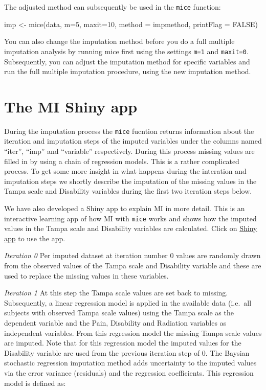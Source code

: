 \documentclass[
]{book}
\newenvironment{Shaded}{\begin{snugshade}}{\end{snugshade}}
\newcommand{\AttributeTok}[1]{\textcolor[rgb]{0.77,0.63,0.00}{#1}}
\newcommand{\ConstantTok}[1]{\textcolor[rgb]{0.00,0.00,0.00}{#1}}
\newcommand{\DecValTok}[1]{\textcolor[rgb]{0.00,0.00,0.81}{#1}}
\newcommand{\FunctionTok}[1]{\textcolor[rgb]{0.00,0.00,0.00}{#1}}
\newcommand{\NormalTok}[1]{#1}
\newcommand{\OtherTok}[1]{\textcolor[rgb]{0.56,0.35,0.01}{#1}}
\begin{document}
The adjusted method can subsequently be used in the \texttt{mice} function:

\begin{Shaded}
\begin{Highlighting}[]
\NormalTok{imp }\OtherTok{\textless{}{-}} \FunctionTok{mice}\NormalTok{(data, }\AttributeTok{m=}\DecValTok{5}\NormalTok{, }\AttributeTok{maxit=}\DecValTok{10}\NormalTok{, }\AttributeTok{method =}\NormalTok{ impmethod,  }\AttributeTok{printFlag =} \ConstantTok{FALSE}\NormalTok{)}
\end{Highlighting}
\end{Shaded}

You can also change the imputation method before you do a full multiple imputation analysis by running mice first using the settings \texttt{m=1} and \texttt{maxit=0}. Subsequently, you can adjust the imputation method for specific variables and run the full multiple imputation procedure, using the new imputation method.

\hypertarget{the-mi-shiny-app}{%
\section{The MI Shiny app}\label{the-mi-shiny-app}}

During the imputation process the \texttt{mice} fucntion returns information about the iteration and imputation steps of the imputed variables under the columns named ``iter'', ``imp'' and ``variable'' respectively. During this process missing values are filled in by using a chain of regression models. This is a rather complicated process. To get some more insight in what happens during the interation and imputation steps we shortly describe the imputation of the missing values in the Tampa scale and Disability variables during the first two iteration steps below.

We have also developed a Shiny app to explain MI in more detail. This is an interactive learning app of how MI with \texttt{mice} works and shows how the imputed values in the Tampa scale and Disability variables are calculated. Click on \href{https://missingdata.shinyapps.io/mi2variables/}{Shiny app} to use the app.

\emph{Iteration 0}
Per imputed dataset at iteration number 0 values are randomly drawn from the observed values of the Tampa scale and Disability variable and these are used to replace the missing values in these variables.

\emph{Iteration 1}
At this step the Tampa scale values are set back to missing. Subsequently, a linear regression model is applied in the available data (i.e.~all subjects with observed Tampa scale values) using the Tampa scale as the dependent variable and the Pain, Disability and Radiation variables as independent variables. From this regression model the missing Tampa scale values are imputed. Note that for this regression model the imputed values for the Disability variable are used from the previous iteration step of 0. The Baysian stochastic regression imputation method adds uncertainty to the imputed values via the error variance (residuals) and the regression coefficients. This regression model is defined as:
\end{document}
